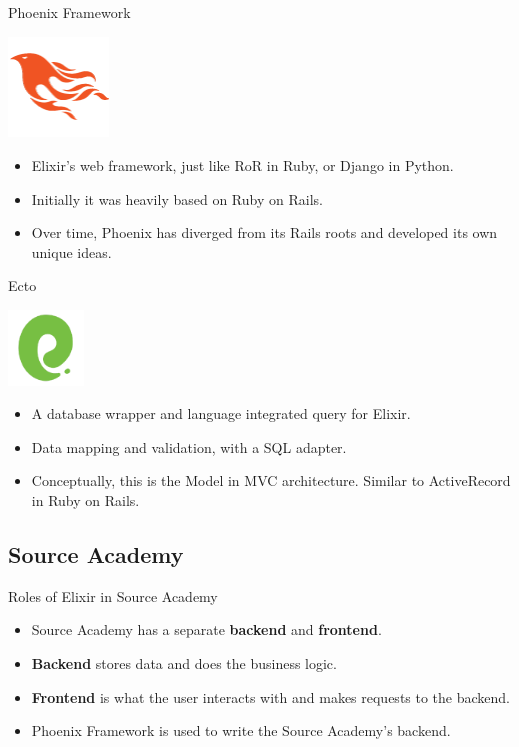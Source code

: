 \documentclass[12pt]{beamer}
\begin{document}
\begin{frame}{Phoenix Framework}
  \begin{center}
    \includegraphics[width=0.2\textwidth]{phoenix}
  \end{center}
  \begin{itemize}
    \item Elixir's web framework, just like RoR in Ruby, or Django in Python.
    \item Initially it was heavily based on Ruby on Rails.
    \item Over time, Phoenix has diverged from its Rails roots and developed its own unique ideas.
  \end{itemize}
\end{frame}

\begin{frame}{Ecto}
  \begin{center}
    \includegraphics[width=0.15\textwidth]{ecto}
  \end{center}
  \begin{itemize}
    \item A database wrapper and language integrated query for Elixir.
    \item Data mapping and validation, with a SQL adapter.
    \item Conceptually, this is the Model in MVC architecture. Similar to ActiveRecord in Ruby on Rails.
  \end{itemize}
\end{frame}

\subsection{Source Academy}
\begin{frame}{Roles of Elixir in Source Academy}
  \begin{itemize}
    \item Source Academy has a separate \textbf{backend} and \textbf{frontend}.
    \item \textbf{Backend} stores data and does the business logic.
    \item \textbf{Frontend} is what the user interacts with and makes requests to the backend.
    \item Phoenix Framework is used to write the Source Academy's backend.
  \end{itemize}
\end{frame}
\end{document}

